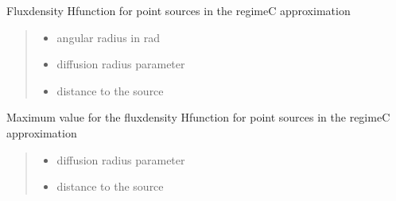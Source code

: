 \documentclass[letterpaper,10pt,english]{sphinxmanual}
\begin{document}
\begin{fulllineitems}
\label{\detokenize{diffsph.profiles:diffsph.profiles.analytics.psfdC}}
\pysigstartsignatures
{}
\pysigstopsignatures
\sphinxAtStartPar
Flux\sphinxhyphen{}density H\sphinxhyphen{}function for point sources in the regime\sphinxhyphen{}C approximation
\begin{quote}\begin{description}
\begin{itemize}
\item {} 
\sphinxAtStartPar
{} \textendash{} angular radius in rad

\item {} 
\sphinxAtStartPar
{} \textendash{} diffusion radius parameter

\item {} 
\sphinxAtStartPar
{} \textendash{} distance to the source

\end{itemize}

\end{description}\end{quote}

\end{fulllineitems}


\begin{fulllineitems}
\label{\detokenize{diffsph.profiles:diffsph.profiles.analytics.psfdCmax}}
\pysigstartsignatures
{}
\pysigstopsignatures
\sphinxAtStartPar
Maximum value for the flux\sphinxhyphen{}density H\sphinxhyphen{}function for point sources in the regime\sphinxhyphen{}C approximation
\begin{quote}\begin{description}
\begin{itemize}
\item {} 
\sphinxAtStartPar
{} \textendash{} diffusion radius parameter

\item {} 
\sphinxAtStartPar
{} \textendash{} distance to the source

\end{itemize}

\end{description}\end{quote}

\end{fulllineitems}
\end{document}
